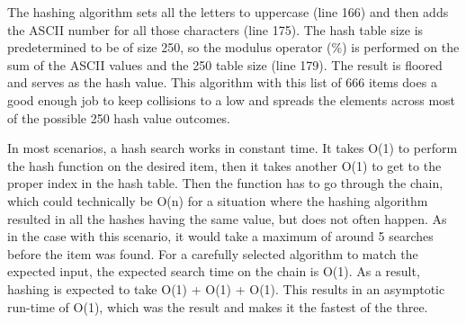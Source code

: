 \documentclass[letterpaper, 10pt,DIV=13]{scrartcl}
\numberwithin{equation}{section} %
\numberwithin{figure}{section} %
\numberwithin{table}{section} %
\begin{document}
The hashing algorithm sets all the letters to uppercase (line 166) and then adds the ASCII number for all those characters (line 175).  The hash table size is predetermined to be of size 250, so the modulus operator (\%) is performed on the sum of the ASCII values and the 250 table size (line 179).  The result is floored and serves as the hash value.  This algorithm with this list of 666 items does a good enough job to keep collisions to a low and spreads the elements across most of the possible 250 hash value outcomes.  

In most scenarios, a hash search works in constant time.  It takes O(1) to perform the hash function on the desired item, then it takes another O(1) to get to the proper index in the hash table.  Then the function has to go through the chain, which could technically be O(n) for a situation where the hashing algorithm resulted in all the hashes having the same value, but does not often happen.  As in the case with this scenario, it would take a maximum of around 5 searches before the item was found.  For a carefully selected algorithm to match the expected input, the expected search time on the chain is O(1).  As a result, hashing is expected to take O(1) + O(1) + O(1).  This results in an asymptotic run-time of O(1), which was the result and makes it the fastest of the three.     
\end{document}
